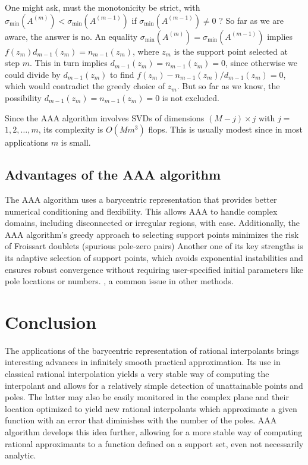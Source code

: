\documentclass[11pt]{article}
\theoremstyle{definition}
\begin{document}
One might ask, must the monotonicity be strict, with $\sigma_{\min }\left(A^{(m)}\right)<\sigma_{\min }\left(A^{(m-1)}\right)$ if $\sigma_{\min }\left(A^{(m-1)}\right) \neq 0$ ? So far as we are aware, the answer is no. An equality $\sigma_{\min }\left(A^{(m)}\right)=\sigma_{\min }\left(A^{(m-1)}\right)$ implies $f\left(z_{m}\right) d_{m-1}\left(z_{m}\right)=n_{m-1}\left(z_{m}\right)$, where $z_{m}$ is the support point selected at step $m$. This in turn implies $d_{m-1}\left(z_{m}\right)=n_{m-1}\left(z_{m}\right)=0$, since otherwise we could divide by $d_{m-1}\left(z_{m}\right)$ to find $f\left(z_{m}\right)-n_{m-1}\left(z_{m}\right) / d_{m-1}\left(z_{m}\right)=0$, which would contradict the greedy choice of $z_{m}$. But so far as we know, the possibility $d_{m-1}\left(z_{m}\right)=n_{m-1}\left(z_{m}\right)=0$ is not excluded.

Since the AAA algorithm involves SVDs of dimensions $(M-j) \times j$ with $j=$ $1,2, \ldots, m$, its complexity is $O\left(M m^{3}\right)$ flops. This is usually modest since in most applications $m$ is small.

\subsection*{Advantages of the AAA algorithm}


The AAA algorithm uses a barycentric representation that provides better numerical conditioning and flexibility. This allows AAA to handle complex domains, including disconnected or irregular regions, with ease. Additionally, the AAA algorithm's greedy approach to selecting support points minimizes the risk of Froissart doublets (spurious pole-zero pairs)
Another one of its key strengths is its adaptive selection of support points, which avoids exponential instabilities and ensures robust convergence without requiring user-specified initial parameters like pole locations or numbers.  , a common issue in other methods.

\section{Conclusion}


The applications of the barycentric representation of rational interpolants brings interesting advances in infinitely smooth practical approximation. Its use in classical rational interpolation yields a very stable way of computing the interpolant and allows for a relatively simple detection of unattainable points and poles. The latter may also be easily monitored in the complex plane and their location optimized to yield new rational interpolants which approximate a given function with an error that diminishes with the number of the poles. AAA algorithm develops this idea further, allowing for a more stable way of computing rational approximants to a function defined on a support set, even not necessarily analytic. 





\printbibliography
\end{document}
